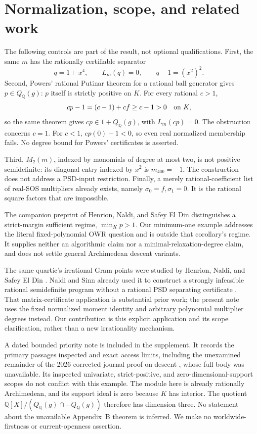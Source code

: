 \documentclass[11pt]{article}
\newcommand{\Q}{\mathbb Q}
\begin{document}
\section{Normalization, scope, and related work}
The following controls are part of the result, not optional qualifications.
First, the same \(m\) has the rationally certifiable separator
\[
 q=1+x^4,\qquad L_m(q)=0,\qquad q-1=(x^2)^2 .
\]
Second, Powers' rational Putinar theorem for a rational ball generator
\cite[Theorem~7]{Powers} gives \(p\in Q_{\Q}(g)\):
\(p\) itself is strictly positive on \(K\).
For every rational \(c>1\),
\[
 cp-1=(c-1)+cf\geq c-1>0 \quad\hbox{on }K,
\]
so the same theorem gives \(cp\in1+Q_{\Q}(g)\), with
\(L_m(cp)=0\). The obstruction concerns \(c=1\). For \(c<1\),
\(cp(0)-1<0\), so even real normalized membership fails.
No degree bound for Powers' certificates is asserted.

Third, \(M_2(m)\), indexed by monomials of degree at most two, is not
positive semidefinite: its diagonal entry indexed by \(x^2\) is
\(m_{400}=-1\). The construction does not address a PSD-input
restriction. Finally, a merely rational-coefficient list of real-SOS
multipliers already exists, namely \(\sigma_0=f,\sigma_1=0\).
It is the rational square factors that are impossible.

The companion preprint of Henrion, Naldi, and Safey El Din
\cite[Definition~3, Corollary~2, and Remark~2]{TMP} distinguishes a
strict-margin sufficient regime, \(\min_Kp>1\). Our minimum-one example
addresses the literal fixed-polynomial OWR question and is outside that
corollary's regime. It supplies neither an algorithmic claim nor a
minimal-relaxation-degree claim, and does not settle general
Archimedean descent variants.

The same quartic's irrational Gram points were studied by Henrion,
Naldi, and Safey El Din \cite[\S6.2]{LMI}. Naldi and Sinn already used it
to construct a strongly infeasible rational semidefinite program without
a rational PSD separating certificate \cite[Example~3.8]{NS}.
That matrix-certificate application is substantial prior work; the
present note uses the fixed normalized moment identity and arbitrary
polynomial multiplier degrees instead. Our contribution is this
explicit application and its scope clarification, rather than a new
irrationality mechanism.

A dated bounded priority note is included in the supplement. It records
the primary passages inspected and exact access limits, including the
unexamined remainder of the 2026 corrected journal proof on descent
\cite{Descent}, whose full body was unavailable. Its inspected
univariate, strict-positive, and zero-dimensional-support scopes do not
conflict with this example. The module here is already rationally
Archimedean, and its support ideal is zero because \(K\) has interior.
The quotient \(\Q[X]/(Q_{\Q}(g)\cap -Q_{\Q}(g))\) therefore has
dimension three. No statement about the unavailable Appendix~B
theorem is inferred. We make no worldwide-firstness or current-openness
assertion.
\end{document}
